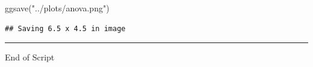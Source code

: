\documentclass[
]{article}
\newenvironment{Shaded}{\begin{snugshade}}{\end{snugshade}}
\newcommand{\FunctionTok}[1]{\textcolor[rgb]{0.00,0.00,0.00}{#1}}
\newcommand{\NormalTok}[1]{#1}
\newcommand{\StringTok}[1]{\textcolor[rgb]{0.31,0.60,0.02}{#1}}
\begin{document}
\begin{Shaded}
\begin{Highlighting}[]
\FunctionTok{ggsave}\NormalTok{(}\StringTok{"../plots/anova.png"}\NormalTok{)}
\end{Highlighting}
\end{Shaded}

\begin{verbatim}
## Saving 6.5 x 4.5 in image
\end{verbatim}

\begin{center}\rule{0.5\linewidth}{0.5pt}\end{center}

End of Script
\end{document}

